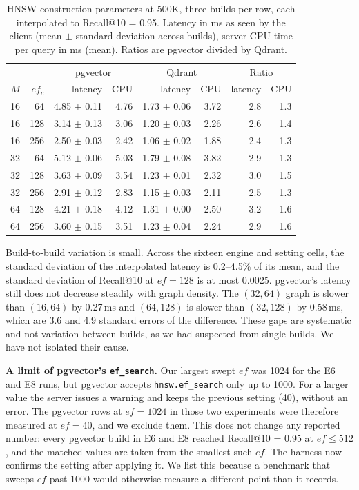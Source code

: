 \documentclass[sigconf, nonacm]{acmart}
\begin{document}
\begin{table}[t]
  \caption{HNSW construction parameters at 500K, three builds per row, each interpolated
  to Recall@10 = 0.95. Latency in ms as seen by the client (mean $\pm$ standard deviation
  across builds), server CPU time per query in ms (mean). Ratios are pgvector divided by
  Qdrant.}
  \label{tab:hnsw}
  \small
  \begin{tabular}{rr|rr|rr|rr}
    \toprule
     & & \multicolumn{2}{c|}{pgvector} & \multicolumn{2}{c|}{Qdrant} & \multicolumn{2}{c}{Ratio} \\
    $M$ & $ef_c$ & latency & CPU & latency & CPU & latency & CPU \\
    \midrule
    16 & 64 & 4.85 $\pm$ 0.11 & 4.76 & 1.73 $\pm$ 0.06 & 3.72 & 2.8 & 1.3 \\
    16 & 128 & 3.14 $\pm$ 0.13 & 3.06 & 1.20 $\pm$ 0.03 & 2.26 & 2.6 & 1.4 \\
    16 & 256 & 2.50 $\pm$ 0.03 & 2.42 & 1.06 $\pm$ 0.02 & 1.88 & 2.4 & 1.3 \\
    32 & 64 & 5.12 $\pm$ 0.06 & 5.03 & 1.79 $\pm$ 0.08 & 3.82 & 2.9 & 1.3 \\
    32 & 128 & 3.63 $\pm$ 0.09 & 3.54 & 1.23 $\pm$ 0.01 & 2.32 & 3.0 & 1.5 \\
    32 & 256 & 2.91 $\pm$ 0.12 & 2.83 & 1.15 $\pm$ 0.03 & 2.11 & 2.5 & 1.3 \\
    64 & 128 & 4.21 $\pm$ 0.18 & 4.12 & 1.31 $\pm$ 0.00 & 2.50 & 3.2 & 1.6 \\
    64 & 256 & 3.60 $\pm$ 0.15 & 3.51 & 1.23 $\pm$ 0.04 & 2.24 & 2.9 & 1.6 \\
    \bottomrule
  \end{tabular}
\end{table}

Build-to-build variation is small. Across the sixteen engine and setting cells, the
standard deviation of the interpolated latency is 0.2--4.5\% of its mean, and the
standard deviation of Recall@10 at $ef=128$ is at most 0.0025. pgvector's latency still
does not decrease steadily with graph density. The $(32,64)$ graph is slower than
$(16,64)$ by 0.27\,ms and $(64,128)$ is slower than $(32,128)$ by 0.58\,ms, which are 3.6
and 4.9 standard errors of the difference. These gaps are systematic and not variation
between builds, as we had suspected from single builds. We have not isolated their cause.

\textbf{A limit of pgvector's \texttt{ef\_search}.} Our largest swept $ef$ was 1024 for the
E6 and E8 runs, but pgvector accepts \texttt{hnsw.ef\_search} only up to 1000. For a larger
value the server issues a warning and keeps the previous setting (40), without an error.
The pgvector rows at $ef=1024$ in those two experiments were therefore measured at
$ef=40$, and we exclude them. This does not change any reported number: every pgvector
build in E6 and E8 reached Recall@10 = 0.95 at $ef\le 512$, and the matched values are
taken from the smallest such $ef$. The harness now confirms the setting after applying
it. We list this because a benchmark that sweeps $ef$ past 1000 would otherwise measure a
different point than it records.
\end{document}
